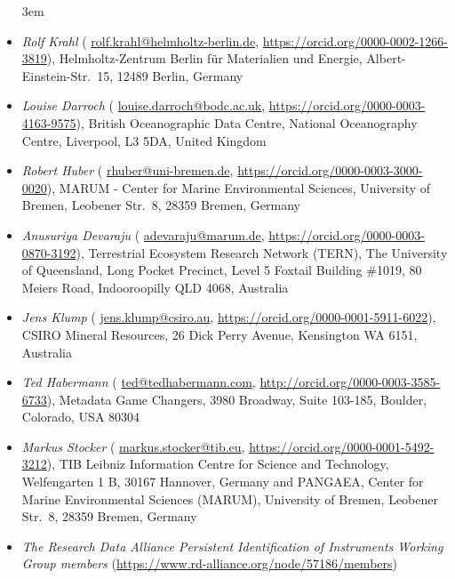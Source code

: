 \documentclass[titlepage=true,twoside=false,DIV=13]{scrartcl}
\begin{document}
\begin{itemize}\emergencystretch 3em
\item \emph{Rolf Krahl}
  ({\small
  \href{mailto:rolf.krahl@helmholtz-berlin.de}{rolf.krahl@helmholtz-berlin.de},
  \url{https://orcid.org/0000-0002-1266-3819}}),
  Helmholtz-Zentrum Berlin für Materialien und Energie,
  Albert-Einstein-Str.\ 15, 12489 Berlin, Germany
\item \emph{Louise Darroch}
  ({\small
  \href{mailto:louise.darroch@bodc.ac.uk}{louise.darroch@bodc.ac.uk},
  \url{https://orcid.org/0000-0003-4163-9575}}),
  British Oceanographic Data Centre, National Oceanography Centre,
  Liverpool, L3 5DA, United Kingdom
\item \emph{Robert Huber}
  ({\small
  \href{mailto:rhuber@uni-bremen.de}{rhuber@uni-bremen.de},
  \url{https://orcid.org/0000-0003-3000-0020}}),
  MARUM - Center for Marine Environmental Sciences, University of Bremen,
  Leobener Str.\ 8, 28359 Bremen, Germany
\item \emph{Anusuriya Devaraju}
  ({\small
  \href{mailto:adevaraju@marum.de}{adevaraju@marum.de},
  \url{https://orcid.org/0000-0003-0870-3192}}),
  Terrestrial Ecosystem Research Network (TERN), The University of
  Queensland, Long Pocket Precinct, Level 5 Foxtail Building \#1019,
  80 Meiers Road, Indooroopilly QLD 4068, Australia
\item \emph{Jens Klump}
  ({\small
  \href{mailto:jens.klump@csiro.au}{jens.klump@csiro.au},
  \url{https://orcid.org/0000-0001-5911-6022}}),
  CSIRO Mineral Resources, 26 Dick Perry Avenue, Kensington WA 6151,
  Australia
\item \emph{Ted Habermann}
  ({\small
  \href{mailto:ted@tedhabermann.com}{ted@tedhabermann.com},
  \url{http://orcid.org/0000-0003-3585-6733}}),
  Metadata Game Changers,
  3980 Broadway, Suite 103-185, Boulder, Colorado, USA 80304
\item \emph{Markus Stocker}
  ({\small
  \href{mailto:markus.stocker@tib.eu}{markus.stocker@tib.eu},
  \url{https://orcid.org/0000-0001-5492-3212}}),
  TIB Leibniz Information Centre for Science and Technology,
  Welfengarten 1 B, 30167 Hannover, Germany and
  PANGAEA, Center for Marine Environmental Sciences (MARUM),
  University of Bremen, Leobener Str.\ 8, 28359 Bremen, Germany
\item \emph{The Research Data Alliance Persistent Identification of Instruments
  Working Group members}
  ({\small \url{https://www.rd-alliance.org/node/57186/members}})
\end{itemize}
\end{document}
